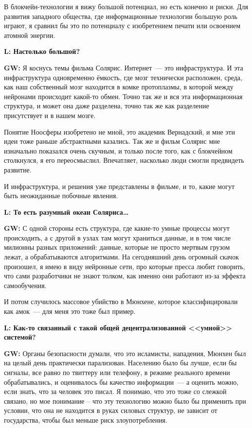 \documentclass[10pt, a5paper]{article}
\begin{document}
\begin{Parallel}[p]{}{}
{В блокчейн-технологии я вижу большой потенциал, но есть конечно и риски. Для развития западного общества, где информационные технологии большую роль играют, я сравнил бы это по потенциалу с изобретением печати или освоением атомной энергии. 

{\noindent \bf L:  Настолько большой?}

{\noindent \bf GW:} Я коснусь темы фильма Солярис. Интернет~--- это инфраструктура. И эта инфраструктура одновременно ёмкость, где мозг технически расположен, среда, как наш собственный мозг находится в комке протоплазмы, в которой между нейронами происходит какой-то обмен.  Точно так же и вся эта информационная структура, и может она даже разделена, точно так же как разделение присутствует и в нашем мозге.

Понятие Ноосферы изобретено не мной, это академик Вернадский, и мне эти идеи тоже раньше  абстрактными казались. Так же и фильм Солярис мне изначально показался очень скучным, и  только после того, как с блокчейном столкнулся, я его переосмыслил. Впечатляет, насколько люди смогли предвидеть развитие. 

И инфраструктура, и решения уже представлены в фильме, и то, какие могут быть неожиданные побочные явления.


{\noindent \bf L: То есть разумный океан Соляриса\ldots }

{\noindent \bf GW:}  С одной стороны есть структура, где какие-то умные процессы могут происходить, а с другой в узлах там могут храниться данные, и в том числе милионны разных приложений: данные, которые не просто мертвым грузом лежат, а обрабатываются алгоритмами. На сегодняшний день огромный скачок произошел, я имею в виду нейронные сети, про которые пресса любит говорить, что сами разработчики не знают толком, как именно они работают из-за эффекта самообучения.

И потом случилось массовое убийство в Мюнхене, которое классифицировали как амок~--- для меня это тоже был пример.

{\noindent \bf L: Как-то связанный с такой общей децентрализованной <<умной>> системой? }

{\noindent \bf GW:}  Органы безопасности думали, что это исламисты, нападения, Мюнхен был на целый день практически парализован. Населению было бы лучше, если бы сигналы, все равно по твиттеру или телефону, в режиме реального времени обрабатывались, и оценивалось бы качество информации~--- а оценить можно, если знать, что за человек это писал. Я понимаю, что это тоже со слежкой связано, но мое понимание – что эту технологию можно было бы применить при условии, что она не находится в руках силовых структур, не зависит от государства, чтобы был меньше риск злоупотребления.


\vfill

     }
   \end{Parallel}

 
\end{document}
